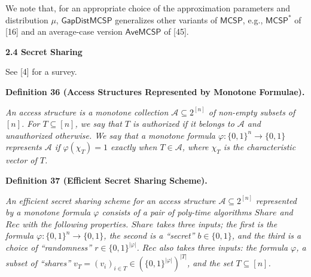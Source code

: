 


We note that, for an appropriate choice of the approximation parameters and distribution $\mu$, ${\mathsf{GapDistMCSP}}$ generalizes other variants of ${\mathsf{MCSP}}$, e.g., ${\mathsf{MCSP}}^{*}$ of [16] and an average-case version ${\mathsf{Ave}}{\mathsf{MCSP}}$ of [45].\par





\par\medskip\noindent\textbf{
2.4 Secret Sharing}\par




See [4] for a survey.\par





\par\medskip\noindent\textbf{
\textbf{Definition 36}\textbf{ }(Access Structures Represented by Monotone Formulae)\textbf{.}
}\par



\emph{An access structure is a monotone collection $\mathcal{A}\subseteq 2^{[n]}$ of non-empty subsets of $[n]$. For $T\subseteq[n]$, we say that $T$ is authorized if it belongs to $\mathcal{A}$ and unauthorized otherwise. We say that a monotone formula $\varphi:\{0,1\}^{n}\to\{0,1\}$ represents $\mathcal{A}$ if $\varphi(\chi_{T})=1$ exactly when $T\in\mathcal{A}$, where $\chi_{T}$ is the characteristic vector of $T$.}\par







\par\medskip\noindent\textbf{
\textbf{Definition 37}\textbf{ }(Efficient Secret Sharing Scheme)\textbf{.}
}\par



\emph{An efficient secret sharing scheme for an access structure $\mathcal{A}\subseteq 2^{[n]}$ represented by a monotone formula $\varphi$ consists of a pair of poly-time algorithms $Share$ and $Rec$ with the following properties. $Share$ takes three inputs; the first is the formula $\varphi:\{0,1\}^{n}\to\{0,1\}$, the second is a “secret” $b\in\{0,1\}$, and the third is a choice of “randomness” $r\in\{0,1\}^{|\varphi|}$. $Rec$ also takes three inputs: the formula $\varphi$, a subset of “shares” $v_{T}=(v_{i})_{i\in T}\in\left(\{0,1\}^{|\varphi|}\right)^{|T|}$, and the set $T\subseteq[n]$.}\par


